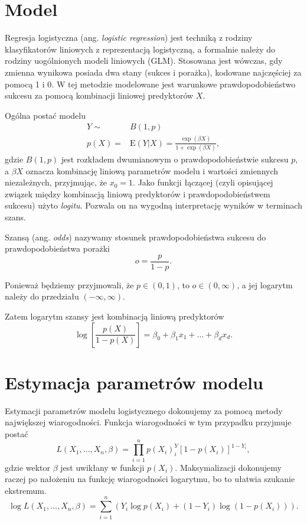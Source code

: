 \documentclass[]{book}
\newcommand{\E}{\mathrm{E}}
\theoremstyle{plain}
\theoremstyle{definition}
\theoremstyle{definition}
\theoremstyle{definition}
\theoremstyle{definition}
\theoremstyle{remark}
\begin{document}
\hypertarget{model-1}{%
\section{Model}\label{model-1}}

Regresja logistyczna (ang. \emph{logistic regression}) jest techniką z rodziny klasyfikatorów liniowych z reprezentacją logistyczną, a formalnie należy do rodziny uogólnionych modeli liniowych (GLM). Stosowana jest wówczas, gdy zmienna wynikowa posiada dwa stany (sukces i porażka), kodowane najczęściej za pomocą 1 i 0. W tej metodzie modelowane jest warunkowe prawdopodobieństwo sukcesu za pomocą kombinacji liniowej predyktorów \(X\).

Ogólna postać modelu
\begin{align}
    Y\sim &B(1, p)\\
    p(X)=&\E(Y|X)=\frac{\exp(\beta X)}{1+\exp(\beta X)},
\end{align}
gdzie \(B(1,p)\) jest rozkładem dwumianowym o prawdopodobieństwie sukcesu \(p\), a \(\beta X\) oznacza kombinację liniową parametrów modelu i wartości zmiennych niezależnych, przyjmując, że \(x_0=1\). Jako funkcji łączącej (czyli opisującej związek między kombinacją liniową predyktorów i prawdopodobieństwem sukcesu) użyto \emph{logitu}. Pozwala on na wygodną interpretację wyników w terminach szans.

Szansą (ang. \emph{odds}) nazywamy stosunek prawdopodobieństwa sukcesu do prawdopodobieństwa porażki
\begin{equation}
    o = \frac{p}{1-p}.
\end{equation}

Ponieważ będziemy przyjmowali, że \(p\in (0,1)\), to \(o\in (0,\infty)\), a jej logarytm należy do przedziału \((-\infty, \infty)\).

Zatem logarytm szansy jest kombinacją liniową predyktorów
\begin{equation}
    \log\left[\frac{p(X)}{1-p(X)}\right]=\beta_0+\beta_1x_1+\ldots+\beta_dx_d.
\end{equation}

\hypertarget{estymacja-parametrow-modelu}{%
\section{Estymacja parametrów modelu}\label{estymacja-parametrow-modelu}}

Estymacji parametrów modelu logistycznego dokonujemy za pomocą metody największej wiarogodności. Funkcja wiarogodności w tym przypadku przyjmuje postać
\begin{equation}
    L(X_1,\ldots,X_n,\beta)=\prod_{i=1}^{n}p(X_i)^Y_i[1-p(X_i)]^{1-Y_i},
\end{equation}
gdzie wektor \(\beta\) jest uwikłany w funkcji \(p(X_i)\). Maksymalizacji dokonujemy raczej po nałożeniu na funkcję wiarogodności logarytmu, bo to ułatwia szukanie ekstremum.
\begin{equation}
    \log L(X_1,\ldots,X_n,\beta) = \sum_{i=1}^n(Y_i\log p(X_i)+(1-Y_i)\log(1-p(X_i))).
\end{equation}
\end{document}
